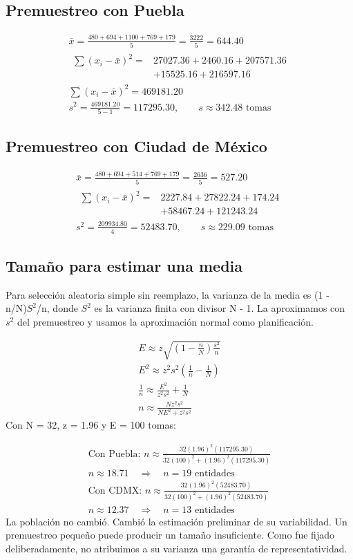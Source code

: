 \documentclass[11pt,letterpaper]{article}
\begin{document}
\subsection{Premuestreo con Puebla}
\begin{gather*}\bar{x}=\frac{480+694+1100+769+179}{5}=\frac{3222}{5}=644.40\\[3pt]\begin{aligned}\sum(x_i-\bar{x})^2={}&27027.36+2460.16+207571.36\\&+15525.16+216597.16\end{aligned}\\[3pt]\sum(x_i-\bar{x})^2=469181.20\\[3pt]s^2=\frac{469181.20}{5-1}=117295.30,\qquad s\approx342.48\text{ tomas}\end{gather*}
\subsection{Premuestreo con Ciudad de México}
\begin{gather*}\bar{x}=\frac{480+694+514+769+179}{5}=\frac{2636}{5}=527.20\\[3pt]\begin{aligned}\sum(x_i-\bar{x})^2={}&2227.84+27822.24+174.24\\&+58467.24+121243.24\end{aligned}\\[3pt]s^2=\frac{209934.80}{4}=52483.70,\qquad s\approx229.09\text{ tomas}\end{gather*}
\clearpage
\subsection{Tamaño para estimar una media}
Para selección aleatoria simple sin reemplazo, la varianza de la media es (1 - n/N)\(S^2\)/n, donde \(S^2\) es la varianza finita con divisor N - 1. La aproximamos con \(s^2\) del premuestreo y usamos la aproximación normal como planificación.

\begin{gather*}E\approx z\sqrt{\left(1-\frac nN\right)\frac{s^2}{n}}\\[3pt]E^2\approx z^2s^2\left(\frac1n-\frac1N\right)\\[3pt]\frac1n\approx\frac{E^2}{z^2s^2}+\frac1N\\[3pt]n\approx\frac{Nz^2s^2}{NE^2+z^2s^2}\end{gather*}
Con N = 32, z = 1.96 y E = 100 tomas:

\begin{gather*}\text{Con Puebla: } n\approx\frac{32(1.96)^2(117295.30)}{32(100)^2+(1.96)^2(117295.30)}\\[3pt]n\approx18.71\quad\Rightarrow\quad n=19\text{ entidades}\\[3pt]\text{Con CDMX: } n\approx\frac{32(1.96)^2(52483.70)}{32(100)^2+(1.96)^2(52483.70)}\\[3pt]n\approx12.37\quad\Rightarrow\quad n=13\text{ entidades}\end{gather*}
La población no cambió. Cambió la estimación preliminar de su variabilidad. Un premuestreo pequeño puede producir un tamaño insuficiente. Como fue fijado deliberadamente, no atribuimos a su varianza una garantía de representatividad.
\end{document}
